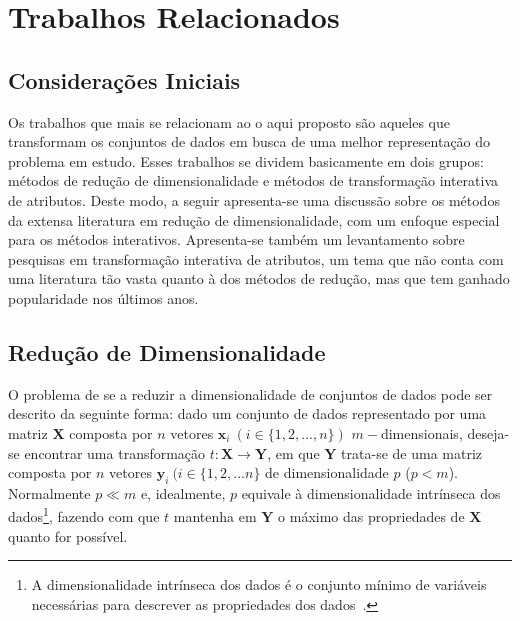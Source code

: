 \chapter{Trabalhos Relacionados}\label{chap:revisao}

\section{Considerações Iniciais}


Os trabalhos que mais se relacionam ao o aqui proposto são
aqueles que transformam os conjuntos de dados em busca de
uma melhor representação do problema em estudo. 
Esses trabalhos se dividem basicamente em dois grupos:
métodos de redução de dimensionalidade e métodos de
transformação interativa de atributos. 
Deste modo, a seguir apresenta-se uma discussão sobre os
métodos da extensa literatura em redução de
dimensionalidade, com um enfoque especial para os métodos
interativos. Apresenta-se também um levantamento sobre
pesquisas em transformação interativa de
atributos, um tema que não conta com uma literatura tão
vasta quanto à dos métodos de redução, mas que tem ganhado
popularidade nos últimos anos.

\section{Redução de Dimensionalidade}

O problema de se a reduzir a dimensionalidade de conjuntos
de dados pode ser descrito da seguinte forma: dado um
conjunto de dados representado por uma matriz $\textbf{X}$
composta por $n$ vetores $\textbf{x}_i~(i \in
\{1,2,...,n\})$ $m-$dimensionais, deseja-se encontrar uma
transformação $t: \textbf{X} \rightarrow \textbf{Y}$, em que 
$\textbf{Y}$ trata-se de uma matriz composta por $n$ vetores
$\textbf{y}_i~(i \in \{1,2,...n\}$ de dimensionalidade $p$
($p < m$).  Normalmente $p \ll m$ e, idealmente, $p$
equivale à dimensionalidade intrínseca dos dados\footnote{A
dimensionalidade intrínseca dos dados é o conjunto mínimo de
variáveis necessárias para descrever as propriedades dos
dados~\cite{Fukunaga1990}.}, fazendo com que $t$ mantenha em
$\textbf{Y}$ o máximo das propriedades de $\textbf{X}$
quanto for possível. 

